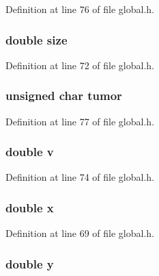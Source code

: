 Definition at line 76 of file global.\-h.

\hypertarget{structcellData_aba3c5d750d5dbd6e86c11ecaca62885e}{
\subsubsection[{size}]{\setlength{\rightskip}{0pt plus 5cm}double size}}\label{structcellData_aba3c5d750d5dbd6e86c11ecaca62885e}


Definition at line 72 of file global.\-h.

\hypertarget{structcellData_a49af8c5336d6c2401bc24f86dbb97b36}{
\subsubsection[{tumor}]{\setlength{\rightskip}{0pt plus 5cm}unsigned char tumor}}\label{structcellData_a49af8c5336d6c2401bc24f86dbb97b36}


Definition at line 77 of file global.\-h.

\hypertarget{structcellData_a3b90d5a73541ab9402511d87bed076ef}{
\subsubsection[{v}]{\setlength{\rightskip}{0pt plus 5cm}double v}}\label{structcellData_a3b90d5a73541ab9402511d87bed076ef}


Definition at line 74 of file global.\-h.

\hypertarget{structcellData_af88b946fb90d5f08b5fb740c70e98c10}{
\subsubsection[{x}]{\setlength{\rightskip}{0pt plus 5cm}double x}}\label{structcellData_af88b946fb90d5f08b5fb740c70e98c10}


Definition at line 69 of file global.\-h.

\hypertarget{structcellData_ab927965981178aa1fba979a37168db2a}{
\subsubsection[{y}]{\setlength{\rightskip}{0pt plus 5cm}double y}}\label{structcellData_ab927965981178aa1fba979a37168db2a}


